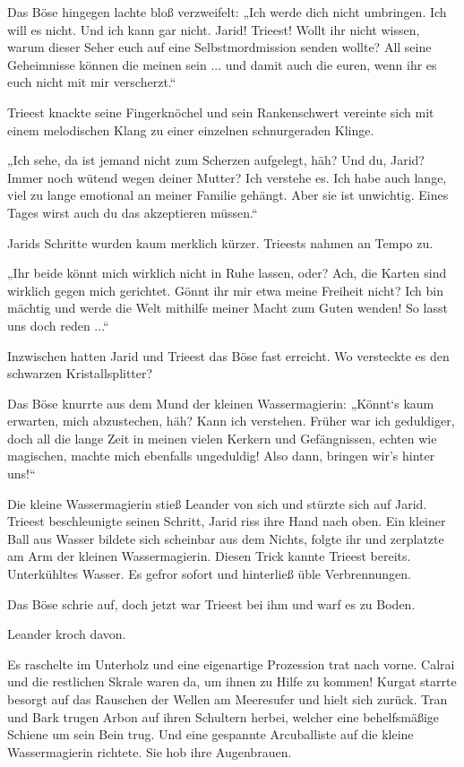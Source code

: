 Das Böse hingegen lachte bloß verzweifelt: „Ich werde dich nicht umbringen. Ich will es nicht. Und ich kann gar nicht. Jarid! Trieest! Wollt ihr nicht wissen, warum dieser Seher euch auf eine Selbstmordmission senden wollte? All seine Geheimnisse können die meinen sein ... und damit auch die euren, wenn ihr es euch nicht mit mir verscherzt.“

Trieest knackte seine Fingerknöchel und sein Rankenschwert vereinte sich mit einem melodischen Klang zu einer einzelnen schnurgeraden Klinge.

„Ich sehe, da ist jemand nicht zum Scherzen aufgelegt, häh? Und du, Jarid? Immer noch wütend wegen deiner Mutter? Ich verstehe es. Ich habe auch lange, viel zu lange emotional an meiner Familie gehängt. Aber sie ist unwichtig. Eines Tages wirst auch du das akzeptieren müssen.“

Jarids Schritte wurden kaum merklich kürzer. Trieests nahmen an Tempo zu.

„Ihr beide könnt mich wirklich nicht in Ruhe lassen, oder? Ach, die Karten sind wirklich gegen mich gerichtet. Gönnt ihr mir etwa meine Freiheit nicht? Ich bin mächtig und werde die Welt mithilfe meiner Macht zum Guten wenden! So lasst uns doch reden ...“

Inzwischen hatten Jarid und Trieest das Böse fast erreicht. Wo versteckte es den schwarzen Kristallsplitter?

Das Böse knurrte aus dem Mund der kleinen Wassermagierin: „Könnt‘s kaum erwarten, mich abzustechen, häh? Kann ich verstehen. Früher war ich geduldiger, doch all die lange Zeit in meinen vielen Kerkern und Gefängnissen, echten wie magischen, machte mich ebenfalls ungeduldig! Also dann, bringen wir’s hinter uns!“

Die kleine Wassermagierin stieß Leander von sich und stürzte sich auf Jarid. Trieest beschleunigte seinen Schritt, Jarid riss ihre Hand nach oben. Ein kleiner Ball aus Wasser bildete sich scheinbar aus dem Nichts, folgte ihr und zerplatzte am Arm der kleinen Wassermagierin. Diesen Trick kannte Trieest bereits. Unterkühltes Wasser. Es gefror sofort und hinterließ üble Verbrennungen.

Das Böse schrie auf, doch jetzt war Trieest bei ihm und warf es zu Boden.

Leander kroch davon.

Es raschelte im Unterholz und eine eigenartige Prozession trat nach vorne. Calrai und die restlichen Skrale waren da, um ihnen zu Hilfe zu kommen! Kurgat starrte besorgt auf das Rauschen der Wellen am Meeresufer und hielt sich zurück. Tran und Bark trugen Arbon auf ihren Schultern herbei, welcher eine behelfsmäßige Schiene um sein Bein trug. Und eine gespannte Arcuballiste auf die kleine Wassermagierin richtete. Sie hob ihre Augenbrauen.

